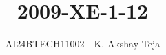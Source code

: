 \documentclass[journal,9pt,onecolumn]{IEEEtran}
\begin{document}

\vspace{3cm}
\title{2009-XE-1-12}
\author{AI24BTECH11002 - K. Akshay Teja}
\maketitle
 \bigskip
{\let\newpage\relax\maketitle}

\renewcommand{\thefigure}{\theenumi}
\renewcommand{\thetable}{\theenumi}
\setlength{\intextsep}{10pt} %

\renewcommand{\thetable}{\theenumi}
\end{document}
